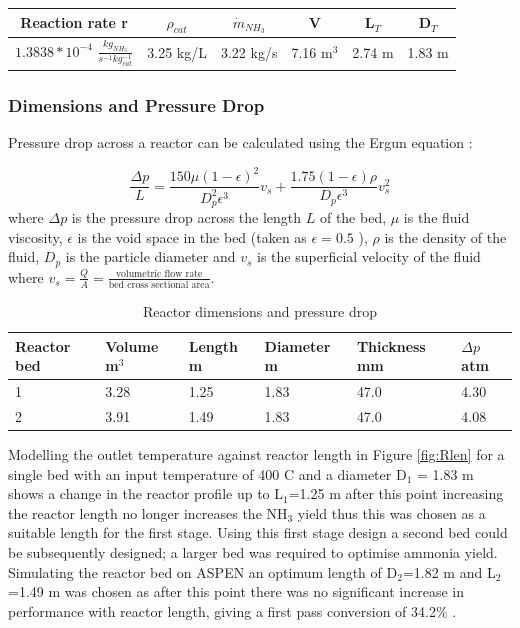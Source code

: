 \documentclass[11pt, a4paper]{article}
\begin{document}
{\begin{table}[!htbp]
\begin{center}
		\begin{tabular}{|c|c|c|c|c|c|}
			\hline
			Reaction rate r& $\rho_{cat}$ & $\dot{m}_{NH_3}$ & V  & L$_T$ & D$_T$ \\ \hline
			$1.3838*10^{-4}$ $\frac{kg_{NH_3}}{s^{-1}kg_{cat}^{-1}}$       & 3.25 kg/L         & 3.22 kg/s                      & 7.16 m$^3$ & 2.74 m & 1.83 m \\ \hline
		\end{tabular}
		
	\end{center}
\end{table}

\subsubsection{Dimensions and Pressure Drop}

Pressure drop across a reactor can be calculated using the Ergun equation \cite{Ergun1949}:

\begin{equation}
\frac{\Delta p}{L}= \frac{150\mu(1-\epsilon)^2}{D_p^2\epsilon ^3}v_s+\frac{1.75(1-\epsilon)\rho}{D_p\epsilon ^3}v_s^2
\end{equation}
where $\Delta p$ is the pressure drop across the length $L$ of the bed, $\mu$ is the fluid viscosity, $\epsilon$ is the void space in the bed (taken as $\epsilon = 0.5$ \cite{Ergun1949}), $\rho$ is the density of the fluid, $D_p$ is the particle diameter and $v_s$ is the superficial velocity of the fluid where $v_s = \frac{Q}{A} = \frac{\text{volumetric flow rate}}{\text{bed cross sectional area}}$.
\begin{table}[!htbp]
	\begin{center}
		\caption{Reactor dimensions and pressure drop}
		\begin{tabular}{ |p{2.3cm}|p{2.3cm}|p{2.3cm}|p{2.3cm}|p{2.7cm}|p{2.3cm}| }
			\hline
			
			Reactor bed & Volume m$^3$& Length m&Diameter m&Thickness mm&$\Delta p$ atm\\
			\hline
			1&3.28 & 1.25 &1.83 &47.0& 4.30\\
			\hline
			2&3.91 & 1.49 &1.83 &47.0&4.08\\
			
			\hline
		\end{tabular}
	\end{center}
\end{table}


Modelling the outlet temperature against reactor length in Figure \ref{fig:Rlen} for a single bed with an input temperature of 400 \textdegree C and a diameter D$_1$ = 1.83 m shows a change in the reactor profile up to L$_1$=1.25 m after this point increasing the reactor length no longer increases the NH$_3$ yield thus this was chosen as a suitable length for the first stage. Using this first stage design a second bed could be subsequently designed; a larger bed was required to optimise ammonia yield. Simulating the reactor bed on ASPEN an optimum length of D$_2$=1.82 m and L$_2$=1.49 m was chosen as after this point there was no significant increase in performance with reactor length, giving a first pass conversion of 34.2\% \cite{Elnashaie1989}.

}
\end{document}
